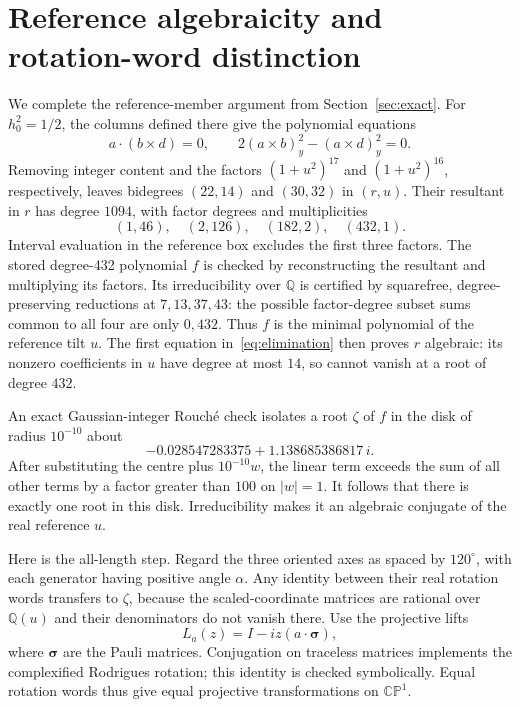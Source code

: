 \section{Reference algebraicity and rotation-word distinction}\label{app:reference}
We complete the reference-member argument from Section~\ref{sec:exact}.
For $h_0^2=1/2$, the columns defined there give the polynomial equations
\begin{equation}\label{eq:elimination}
a\cdot(b\times d)=0,\qquad
2(a\times b)_y^2-(a\times d)_y^2=0.
\end{equation}
Removing integer content and the factors $(1+u^2)^{17}$ and
$(1+u^2)^{16}$, respectively, leaves bidegrees $(22,14)$ and $(30,32)$ in
$(r,u)$. Their resultant in $r$ has degree $1094$, with factor degrees and
multiplicities
\[
(1,46),\quad(2,126),\quad(182,2),\quad(432,1).
\]
Interval evaluation in the reference box excludes the first three factors.
The stored degree-432 polynomial $f$ is checked by reconstructing the
resultant and multiplying its factors. Its irreducibility over $\mathbb Q$
is certified by squarefree, degree-preserving reductions at $7,13,37,43$:
the possible factor-degree subset sums common to all four are only $0,432$.
Thus $f$ is the minimal polynomial of the reference tilt $u$.
The first equation in~\eqref{eq:elimination} then proves $r$ algebraic:
its nonzero coefficients in $u$ have degree at most $14$, so cannot vanish
at a root of degree $432$.

An exact Gaussian-integer Rouch\'e check isolates a root $\zeta$ of $f$ in
the disk of radius $10^{-10}$ about
\[
-0.028547283375+1.138685386817\,i.
\]
After substituting the centre plus $10^{-10}w$, the linear term exceeds the
sum of all other terms by a factor greater than $100$ on $|w|=1$.
It follows that there is exactly one root in this disk. Irreducibility makes
it an algebraic conjugate of the real reference $u$.

Here is the all-length step. Regard the three oriented axes as spaced by
$120^\circ$, with each generator having positive angle $\alpha$.
Any identity between their real rotation words transfers to $\zeta$, because
the scaled-coordinate matrices are rational over $\mathbb Q(u)$ and their
denominators do not vanish there. Use the projective lifts
\[
L_a(z)=I-iz(a\cdot\boldsymbol\sigma),
\]
where $\boldsymbol\sigma$ are the Pauli matrices. Conjugation on traceless
matrices implements the complexified Rodrigues rotation; this identity is
checked symbolically. Equal rotation words thus give equal projective
transformations on $\mathbb{CP}^1$.

